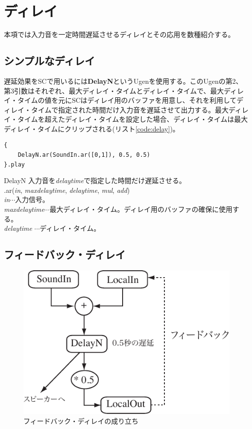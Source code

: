 \documentclass{jsarticle}
\begin{document}
\section{ディレイ}
本項では入力音を一定時間遅延させるディレイとその応用を数種紹介する。

\subsection{シンプルなディレイ}

遅延効果をSCで用いるには{\bf DelayN}というUgenを使用する。このUgenの第2、第3引数はそれぞれ、最大ディレイ・タイムとディレイ・タイムで、最大ディレイ・タイムの値を元にSCはディレイ用のバッファを用意し、それを利用してディレイ・タイムで指定された時間だけ入力音を遅延させて出力する。最大ディレイ・タイムを超えたディレイ・タイムを設定した場合、ディレイ・タイムは最大ディレイ・タイムにクリップされる(リスト\ref{code:delay})。
\begin{lstlisting}[caption=ディレイ, label=code:delay]
{
	DelayN.ar(SoundIn.ar([0,1]), 0.5, 0.5)
}.play
\end{lstlisting}

\begin{itembox}[l]{DelayN}
	{\footnotesize 
	入力音を{\it delaytime}で指定した時間だけ遅延させる。\\
	.ar({\it in}, {\it maxdelaytime}, {\it delaytime}, {\it mul}, {\it add})\\
	{\it in}$\cdots$入力信号。\\
	{\it maxdelaytime}$\cdots$最大ディレイ・タイム。ディレイ用のバッファの確保に使用する。\\
	{\it delaytime} $\cdots$ディレイ・タイム。
	}
\end{itembox}

\subsection{フィードバック・ディレイ}
\begin{figure}[htbp]
	\begin{center}
		\includegraphics[scale=0.7]{feedback.pdf}
	\end{center}
	\caption{フィードバック・ディレイの成り立ち}
	\label{fig:feedback}
\end{figure}
\end{document}
